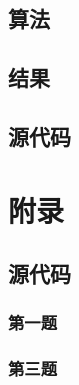 \documentclass[UTF-8]{article}
\begin{document}
\subsection{算法}
\subsection{结果}
\subsection{源代码}
\clearpage
\appendix
\section{附录}
\subsection{源代码}
\subsubsection{第一题}
\label{subsec:Q_1}
\begin{spacing}{1.0}
	
\end{spacing}

\subsubsection{第三题}
\label{subsec:Q_3}
\begin{spacing}{1.0}
	
\end{spacing}
\end{document}
